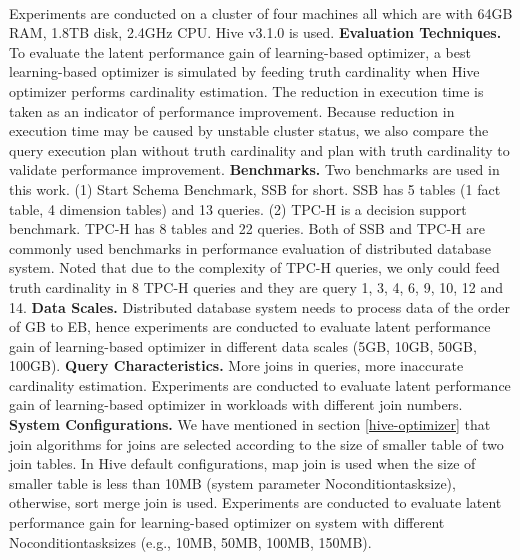        \paragraph{}
        Experiments are conducted on a cluster of four machines all which are with 64GB RAM, 1.8TB disk, 2.4GHz CPU. Hive v3.1.0 is used.   
        \newline
        \textbf{Evaluation Techniques.} To evaluate the latent performance gain of learning-based optimizer, a best learning-based optimizer is simulated
        by feeding truth cardinality when Hive optimizer performs cardinality estimation. The reduction in execution time is taken as an indicator of performance 
        improvement. Because reduction in execution time may be caused by unstable cluster status, we also compare the query execution plan without truth 
        cardinality and plan with truth cardinality to validate performance improvement.
        \newline
        \textbf{Benchmarks.} Two benchmarks are used in this work. (1) Start Schema Benchmark\cite{ssb}, SSB for short. SSB has 5 tables (1 fact table, 4 dimension tables)
        and 13 queries. (2) TPC-H is a decision support benchmark. TPC-H has 8 tables and 22 queries. Both of SSB and TPC-H are commonly used benchmarks in performance 
        evaluation of distributed database system. Noted that due to the complexity of TPC-H queries, we only could feed truth cardinality in 8 TPC-H queries and they are 
        query 1, 3, 4, 6, 9, 10, 12 and 14.
        \newline
        \textbf{Data Scales.} Distributed database system needs to process data of the order of GB to EB, hence experiments are conducted to evaluate latent performance gain
        of learning-based optimizer in different data scales (5GB, 10GB, 50GB, 100GB). 
        \newline
        \textbf{Query Characteristics.} More joins in queries, more inaccurate cardinality estimation. Experiments are conducted to evaluate latent performance gain of 
        learning-based optimizer in workloads with different join numbers.
        \newline
        \textbf{System Configurations.} We have mentioned in section \ref{hive-optimizer} that join algorithms for joins are selected according to the size of smaller 
        table of two join tables. In Hive default configurations, map join is used when the size of smaller table is less than 10MB (system parameter Noconditiontasksize), 
        otherwise, sort merge join is used. Experiments are conducted to evaluate latent performance gain for learning-based optimizer 
        on system with different Noconditiontasksizes (e.g., 10MB, 50MB, 100MB, 150MB). 
